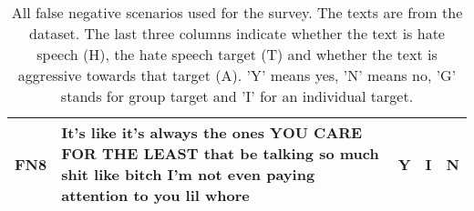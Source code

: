 \begin{table}[H]
\begin{tabular}{lp{10cm}ccc}
        \textbf{FN8} & It's like it's always the ones YOU CARE FOR THE LEAST that be talking so much shit like bitch I'm not even paying attention to you lil whore & Y                              & I                              & N                              \\
        \bottomrule
    \end{tabular}
    \caption{All false negative scenarios used for the survey. The texts are from the \citet{basile2019semeval} dataset. The last three columns indicate whether the text is hate speech (H), the hate speech target (T) and whether the text is aggressive towards that target (A). 'Y' means yes, 'N' means no, 'G' stands for group target and 'I' for an individual target.}
    \label{tab:scenarios-fn}
\end{table}

